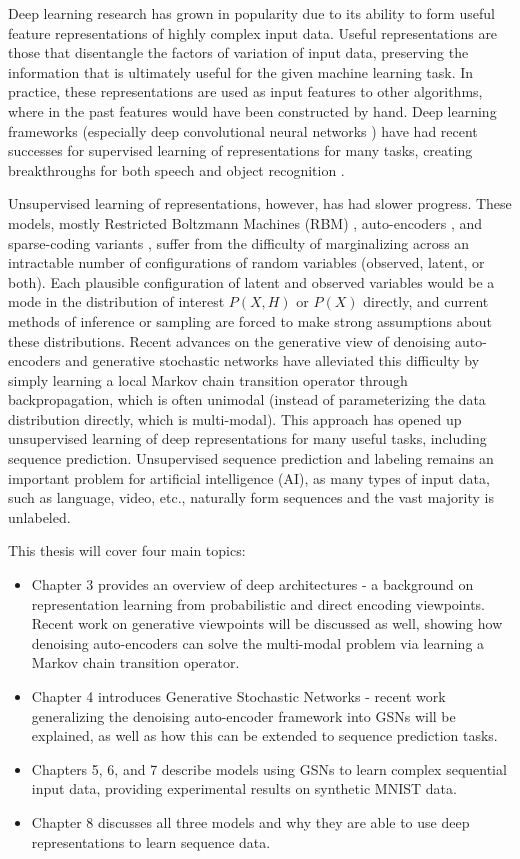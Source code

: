 Deep learning research has grown in popularity due to its ability to form useful feature representations of highly complex input data. Useful representations are those that disentangle the factors of variation of input data, preserving the information that is ultimately useful for the given machine learning task. In practice, these representations are used as input features to other algorithms, where in the past features would have been constructed by hand. Deep learning frameworks (especially deep convolutional neural networks \cite{lenet5}) have had recent successes for supervised learning of representations for many tasks, creating breakthroughs for both speech and object recognition \cite{seide11, krizhevsky12}.

Unsupervised learning of representations, however, has had slower progress. These models, mostly Restricted Boltzmann Machines (RBM) \cite{hinton06}, auto-encoders \cite{alain12}, and sparse-coding variants \cite{ranzato07}, suffer from the difficulty of marginalizing across an intractable number of configurations of random variables (observed, latent, or both). Each plausible configuration of latent and observed variables would be a mode in the distribution of interest \(P(X,H)\) or \(P(X)\) directly, and current methods of inference or sampling are forced to make strong assumptions about these distributions. Recent advances on the generative view of denoising auto-encoders and generative stochastic networks \cite{gsn} have alleviated this difficulty by simply learning a local Markov chain transition operator through backpropagation, which is often unimodal (instead of parameterizing the data distribution directly, which is multi-modal). This approach has opened up unsupervised learning of deep representations for many useful tasks, including sequence prediction. Unsupervised sequence prediction and labeling remains an important problem for artificial intelligence (AI), as many types of input data, such as language, video, etc., naturally form sequences and the vast majority is unlabeled.

This thesis will cover four main topics:
\begin{itemize}
	\item Chapter 3 provides an overview of deep architectures - a background on representation learning from probabilistic and direct encoding viewpoints. Recent work on generative viewpoints will be discussed as well, showing how denoising auto-encoders can solve the multi-modal problem via learning a Markov chain transition operator.
	\item Chapter 4 introduces Generative Stochastic Networks - recent work generalizing the denoising auto-encoder framework into GSNs will be explained, as well as how this can be extended to sequence prediction tasks.
	\item Chapters 5, 6, and 7 describe models using GSNs to learn complex sequential input data, providing experimental results on synthetic MNIST data.
	\item Chapter 8 discusses all three models and why they are able to use deep representations to learn sequence data.
\end{itemize}